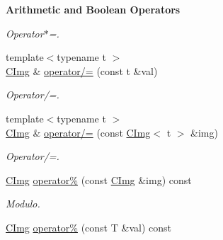 \begin{Indent}{\bf Arithmetic and Boolean Operators}
\begin{DoxyCompactItemize}
\begin{DoxyCompactList}\small\item\em Operator$\ast$=. \item\end{DoxyCompactList}\item 
\hypertarget{structcimg__library_1_1_c_img_a263b5911f1baa72ca1d08cfde5cd8937}{
{\footnotesize template$<$typename t $>$ }\\\hyperlink{structcimg__library_1_1_c_img}{CImg} \& \hyperlink{structcimg__library_1_1_c_img_a263b5911f1baa72ca1d08cfde5cd8937}{operator/=} (const t \&val)}
\label{structcimg__library_1_1_c_img_a263b5911f1baa72ca1d08cfde5cd8937}

\begin{DoxyCompactList}\small\item\em Operator/=. \item\end{DoxyCompactList}\item 
\hypertarget{structcimg__library_1_1_c_img_aa1b9abd715acaf687dcfd95946ba3734}{
{\footnotesize template$<$typename t $>$ }\\\hyperlink{structcimg__library_1_1_c_img}{CImg} \& \hyperlink{structcimg__library_1_1_c_img_aa1b9abd715acaf687dcfd95946ba3734}{operator/=} (const \hyperlink{structcimg__library_1_1_c_img}{CImg}$<$ t $>$ \&img)}
\label{structcimg__library_1_1_c_img_aa1b9abd715acaf687dcfd95946ba3734}

\begin{DoxyCompactList}\small\item\em Operator/=. \item\end{DoxyCompactList}\item 
\hypertarget{structcimg__library_1_1_c_img_a785881da78aec90b6c91e32c472066de}{
\hyperlink{structcimg__library_1_1_c_img}{CImg} \hyperlink{structcimg__library_1_1_c_img_a785881da78aec90b6c91e32c472066de}{operator\%} (const \hyperlink{structcimg__library_1_1_c_img}{CImg} \&img) const }
\label{structcimg__library_1_1_c_img_a785881da78aec90b6c91e32c472066de}

\begin{DoxyCompactList}\small\item\em Modulo. \item\end{DoxyCompactList}\item 
\hypertarget{structcimg__library_1_1_c_img_aafbc4f1ab811546a85364618608eebfc}{
\hyperlink{structcimg__library_1_1_c_img}{CImg} \hyperlink{structcimg__library_1_1_c_img_aafbc4f1ab811546a85364618608eebfc}{operator\%} (const T \&val) const }
\label{structcimg__library_1_1_c_img_aafbc4f1ab811546a85364618608eebfc}


\end{DoxyCompactItemize}
\end{Indent}
